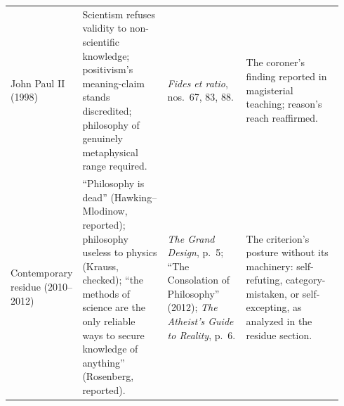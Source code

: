 \begin{longtable}{>{\raggedright\arraybackslash}p{0.135\linewidth}>{\raggedright\arraybackslash}p{0.265\linewidth}>{\raggedright\arraybackslash}p{0.24\linewidth}>{\raggedright\arraybackslash}p{0.30\linewidth}}
John Paul II (1998) & Scientism refuses validity to non-scientific knowledge; positivism's meaning-claim stands discredited; philosophy of genuinely metaphysical range required. & \emph{Fides et ratio}, nos.~67, 83, 88. & The coroner's finding reported in magisterial teaching; reason's reach reaffirmed.\\
Contemporary residue (2010--2012) & ``Philosophy is dead'' (Hawking--Mlodinow, reported); philosophy useless to physics (Krauss, checked); ``the methods of science are the only reliable ways to secure knowledge of anything'' (Rosenberg, reported). & \emph{The Grand Design}, p.~5; ``The Consolation of Philosophy'' (2012); \emph{The Atheist's Guide to Reality}, p.~6. & The criterion's posture without its machinery: self-refuting, category-mistaken, or self-excepting, as analyzed in the residue section.\\
\end{longtable}
\endgroup
